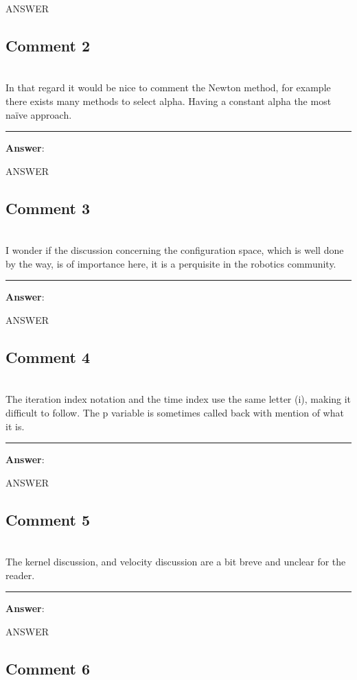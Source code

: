 \documentclass{scrartcl}
\begin{document}
ANSWER

\subsection{Comment 2}
\hrulefill\\

In that regard it would be nice to comment the Newton method, for example there exists many methods to select alpha. Having a constant alpha the most naïve approach.

\rule{\linewidth}{.1pt}
\textbf{Answer}:

ANSWER

\subsection{Comment 3}
\hrulefill\\

I wonder if the discussion concerning the configuration space, which is well done by the way, is of importance here, it is a perquisite in the robotics community.

\rule{\linewidth}{.1pt}
\textbf{Answer}:

ANSWER

\subsection{Comment 4}
\hrulefill\\

The iteration index notation and the time index use the same letter (i), making it difficult to follow. The p variable is sometimes called back with mention of what it is.

\rule{\linewidth}{.1pt}
\textbf{Answer}:

ANSWER

\subsection{Comment 5}
\hrulefill\\

The kernel discussion, and velocity discussion are a bit breve and unclear for the reader.

\rule{\linewidth}{.1pt}
\textbf{Answer}:

ANSWER

\subsection{Comment 6}
\hrulefill\\
\end{document}
